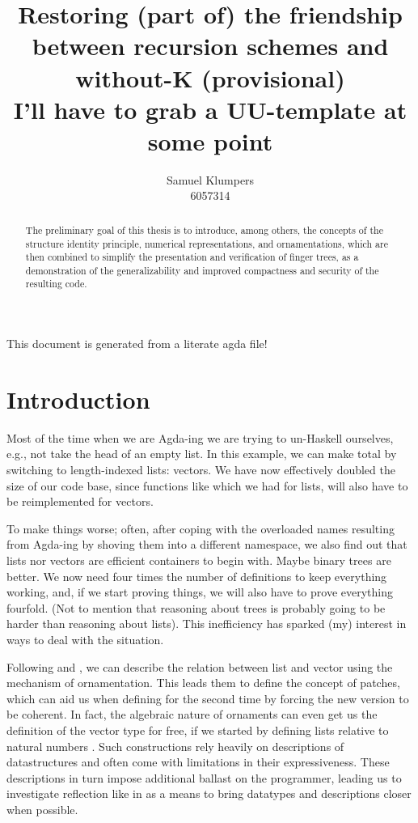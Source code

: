 \documentclass{article}
\title{Restoring (part of) the friendship between recursion schemes and without-K (provisional)\\ \small I'll have to grab a UU-template at some point}
\author{Samuel Klumpers\\6057314}
\begin{document}
\maketitle
\tableofcontents

This document is generated from a literate agda file!
\newpage

\begin{abstract}
    The preliminary goal of this thesis is to introduce, among others, the concepts of the structure identity principle, numerical representations, and ornamentations, which are then combined to simplify the presentation and verification of finger trees, as a demonstration of the generalizability and improved compactness and security of the resulting code. 
\end{abstract}

\section{Introduction}\label{sec:intro}
Most of the time when we are Agda-ing \cite{agda} we are trying to un-Haskell ourselves, e.g., not take the head of an empty list. In this example, we can make  total by switching to length-indexed lists: vectors. We have now effectively doubled the size of our code base, since functions like \AgdaFunction{\_++\_} which we had for lists, will also have to be reimplemented for vectors.

To make things worse; often, after coping with the overloaded names resulting from Agda-ing by shoving them into a different namespace, we also find out that lists nor vectors are efficient containers to begin with. Maybe binary trees are better. We now need four times the number of definitions to keep everything working, and, if we start proving things, we will also have to prove everything fourfold. (Not to mention that reasoning about trees is probably going to be harder than reasoning about lists).  This inefficiency has sparked (my) interest in ways to deal with the situation.

Following \cite{orntrans} and \cite{progorn}, we can describe the relation between list and vector using the mechanism of ornamentation. This leads them to define the concept of patches, which can aid us when defining \AgdaFunction{\_++\_} for the second time by forcing the new version to be coherent. In fact, the algebraic nature of ornaments can even get us the definition of the vector type for free, if we started by defining lists relative to natural numbers \cite{algorn}. Such constructions rely heavily on descriptions of datastructures and often come with limitations in their expressiveness. These descriptions in turn impose additional ballast on the programmer, leading us to investigate reflection like in \cite{practgen} as a means to bring datatypes and descriptions closer when possible.
\end{document}
